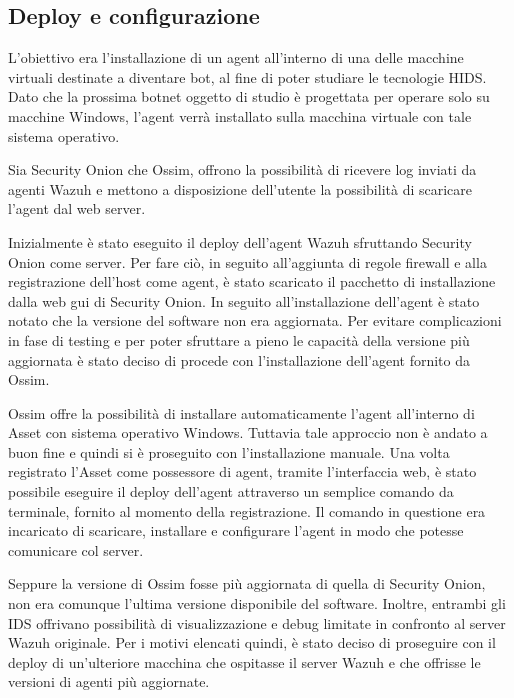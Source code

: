 \subsection{Deploy e configurazione}
 L'obiettivo era l'installazione di un agent all'interno di una delle macchine virtuali destinate a diventare bot, al fine di poter studiare le tecnologie  HIDS. Dato che la prossima botnet oggetto di studio è progettata per operare solo su macchine  Windows, l'agent verrà installato sulla macchina virtuale con tale sistema operativo.
 
Sia Security Onion che Ossim, offrono la possibilità di ricevere log inviati da agenti Wazuh  e mettono a disposizione dell'utente la possibilità di scaricare l'agent dal web server.

Inizialmente è stato eseguito il deploy dell'agent Wazuh sfruttando  Security Onion come server. Per fare ciò, in seguito all'aggiunta di regole firewall e alla registrazione dell'host  come agent, è stato scaricato il pacchetto di installazione dalla web gui di Security Onion. In seguito all'installazione dell'agent è stato notato che la versione del software non era aggiornata. Per evitare complicazioni in fase di testing e per poter sfruttare a pieno le capacità della versione più aggiornata è stato deciso di procede con l'installazione dell'agent fornito da Ossim. 

\medskip

Ossim offre la possibilità di installare automaticamente l'agent all'interno di Asset con sistema operativo Windows. Tuttavia tale approccio non è andato a buon fine e quindi si è proseguito con l'installazione manuale. Una volta registrato l'Asset come possessore di agent, tramite l'interfaccia web, è stato possibile eseguire il deploy dell'agent  attraverso un semplice comando da terminale, fornito al momento della registrazione. Il comando in questione era incaricato  di scaricare, installare e configurare l'agent  in modo che potesse comunicare col server.

Seppure la versione di Ossim fosse più aggiornata di quella di Security Onion, non era comunque l'ultima versione disponibile del software. Inoltre, entrambi gli IDS offrivano possibilità di visualizzazione e debug limitate in confronto al server Wazuh originale.
Per i motivi elencati quindi, è stato deciso di proseguire con il deploy di un'ulteriore macchina che ospitasse il server Wazuh e che offrisse le versioni di agenti più aggiornate.

\medskip

